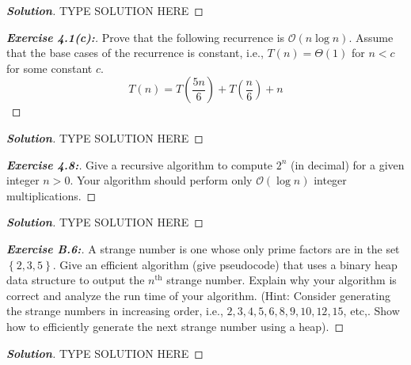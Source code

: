 \documentclass[a4paper]{article}
\newenvironment{solution}{\begin{proof}[\textnormal{\textbf{Solution}}]}{\end{proof}}
\newenvironment{exercise}[1]{\begin{proof}[\textnormal{\textbf{Exercise #1:}}]\renewcommand{\qedsymbol}{}}{\end{proof}}
\newcommand{\bigO}[1]{\mathcal{O}\left(#1\right)}
\newcommand{\bigTh}[1]{\Theta\left(#1\right)}
\newcommand{\set}[1]{\left\lbrace#1\right\rbrace}
\newcommand{\ith}[1]{#1^{\text{th}}}
\begin{document}
\begin{solution}
    TYPE SOLUTION HERE
\end{solution}

\begin{exercise}{4.1(c)}
    Prove that the following recurrence is \(\bigO{n\log{n}}\). Assume that the base cases of the recurrence is constant, i.e., \(T(n) = \bigTh{1}\) for \(n < c\) for some constant \(c\).
    \[T(n) = T\left(\frac{5n}{6}\right) + T\left(\frac{n}{6}\right) + n\]
\end{exercise}

\begin{solution}
    TYPE SOLUTION HERE
\end{solution}

\begin{exercise}{4.8}
    Give a recursive algorithm to compute \(2^n\) (in decimal) for a given integer \(n > 0\). Your algorithm should perform only \(\bigO{\log n}\) integer multiplications.
\end{exercise}

\begin{solution}
    TYPE SOLUTION HERE
\end{solution}

\begin{exercise}{B.6}
    A strange number is one whose only prime factors are in the set \(\set{2, 3, 5}\). Give an efficient algorithm (give pseudocode) that uses a binary heap data structure to output the \(\ith{n}\) strange number. Explain why your algorithm is correct and analyze the run time of your algorithm. (Hint: Consider generating the strange numbers in increasing order, i.e., \(2,3,4,5,6,8,9,10,12,15\), etc,. Show how to efficiently generate the next strange number using a heap).
\end{exercise}

\begin{solution}
    TYPE SOLUTION HERE
\end{solution}
\end{document}
